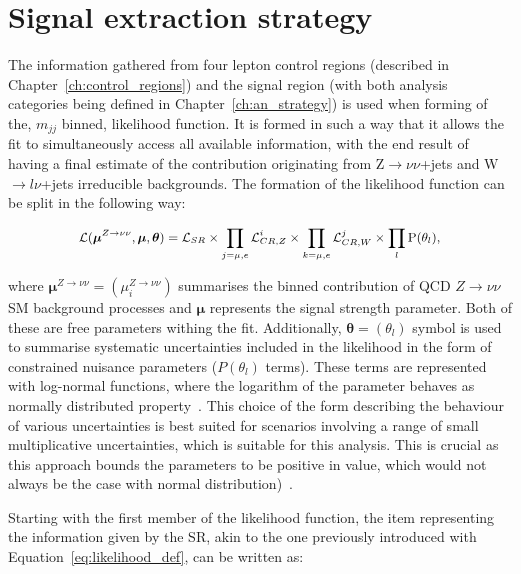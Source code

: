 \section{Signal extraction strategy}
\hspace{10pt} The information gathered from four lepton control regions (described in Chapter~\ref{ch:control_regions}) and the signal region (with both analysis categories being defined in Chapter~\ref{ch:an_strategy}) is used when forming of the, $m_{jj}$ binned, likelihood function. It is formed in such a way that it allows the fit to simultaneously access all available information, with the end result of having a final estimate of the contribution originating from Z$\rightarrow \nu\nu$+jets and W$\rightarrow l\nu$+jets irreducible backgrounds. The formation of the likelihood function can be split in the following way:

\begin{equation}
   \small{ \mathcal{L}(\boldsymbol{\mu}^{Z\rightarrow \nu\nu}, \boldsymbol{\mu}, \boldsymbol{\theta}) =  \mathcal{L}_{SR}\times \prod_{j = \mu, e} \mathcal{L}_{CR,Z}^i \times \prod_{k = \mu, e} \mathcal{L}_{CR,W}^j\times\prod_{l}\text{P}(\theta_l) ,}
    \label{eq:likelihood_total}
\end{equation}

where $\boldsymbol{\mu}^{Z\rightarrow \nu\nu} = (\mu_i^{Z\rightarrow \nu\nu})$ summarises the binned contribution of QCD $Z\rightarrow \nu\nu$ SM background processes and $\boldsymbol{\mu}$ represents the signal strength parameter. Both of these are free parameters withing the fit. Additionally, $\boldsymbol{\theta} = (\theta_l)$ symbol is used to summarise systematic uncertainties included in the likelihood in the form of constrained nuisance parameters ($P(\theta_l)$ terms). These terms are represented with log-normal functions, where the logarithm of the parameter behaves as normally distributed property~\cite{paper:HIG_17_023}. This choice of the form describing the behaviour of various uncertainties is best suited for scenarios involving a range of small multiplicative uncertainties, which is suitable for this analysis. This is crucial as this approach bounds the parameters to be positive in value, which would not always be the case with normal distribution)~\cite{paper:log_norm, paper:log_norm1,paper:log_norm2}.

\hspace{10pt} Starting with the first member of the likelihood function, the item representing the information given by the SR, akin to the one previously introduced with Equation~\ref{eq:likelihood_def}, can be written as:

